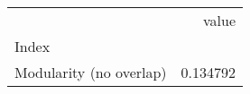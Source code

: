 \begin{tabular}{lr}
\toprule
{} &     value \\
Index                   &           \\
\midrule
Modularity (no overlap) &  0.134792 \\
\bottomrule
\end{tabular}
